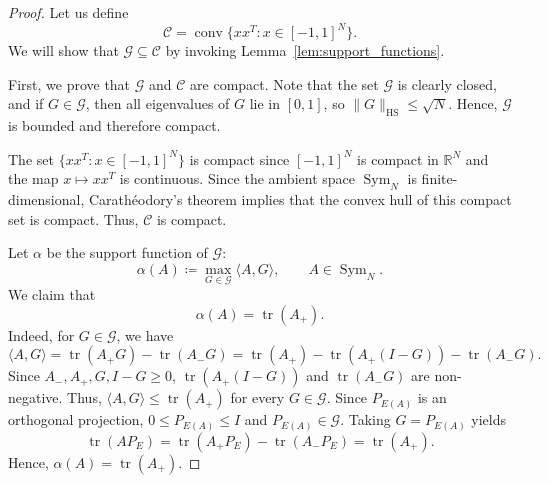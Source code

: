 \documentclass[reqno,a4paper,12pt]{amsart}
\numberwithin{equation}{section}
\newcommand\1{\mathds{1}}
\DeclareMathOperator{\tr}{tr}
\begin{document}
\begin{proof}
Let us define
\begin{equation*}
    \mathcal C=\operatorname{conv}\{xx^T:x\in [-1,1]^N\}.
\end{equation*}
We will show that $\mathcal G \subseteq \mathcal C$ by invoking Lemma~\ref{lem:support_functions}. 

First, we prove that $\mathcal G$ and $\mathcal C$ are compact. Note that the set $\mathcal G$ is clearly closed, and if $G\in\mathcal G$, then all eigenvalues of $G$ lie in $[0,1]$, so $\|G\|_{\mathrm{HS}}\le \sqrt N$. Hence, $\mathcal G$ is bounded and therefore compact.

The set $\{xx^T:x\in [-1,1]^N\}$ is compact since $[-1,1]^N$ is compact in $\mathbb R^N$ and the map $x\longmapsto xx^T$ is continuous. Since the ambient space $\operatorname{Sym}_N$ is finite-dimensional, Carathéodory's theorem implies that the convex hull of this compact set is compact. Thus, $\mathcal C$ is compact.

Let $\alpha$ be the support function of $\mathcal G$:
\begin{equation*}
    \alpha(A)\coloneqq\max_{G\in\mathcal G}\langle A,G\rangle,
    \qquad A\in\operatorname{Sym}_N.
\end{equation*}
We claim that
\begin{equation*}
\alpha(A)=\tr(A_+).
\end{equation*}
Indeed, for $G\in\mathcal G$, we have
\begin{equation*}
\langle A,G\rangle
=
\tr(A_+G)-\tr(A_-G)
=
\tr(A_+) - \tr(A_+(I-G)) - \tr(A_-G).
\end{equation*}
Since $A_-,A_+,G,I-G\geq 0$, $\tr(A_+(I-G))$ and $\tr(A_-G)$ are non-negative. Thus, $\langle A,G\rangle\le \tr(A_+)$ for every $G\in\mathcal G$. Since $P_{E(A)}$ is an orthogonal projection, $0\le P_{E(A)}\le I$ and $P_{E(A)}\in\mathcal G$. Taking $G=P_{E(A)}$ yields
\begin{equation*}
\tr(AP_E)
=
\tr(A_+P_E)-\tr(A_-P_E)
=
\tr(A_+).
\end{equation*}
Hence, $\alpha(A)=\tr(A_+)$.


\end{proof}
\end{document}
